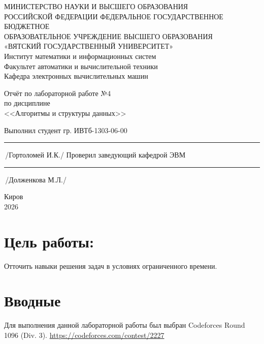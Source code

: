 \documentclass[oneside,a4paper,14pt]{extarticle} %
\begin{document}
	\newpage\thispagestyle{empty}
	\begin{center}
		МИНИСТЕРСТВО НАУКИ И ВЫСШЕГО ОБРАЗОВАНИЯ\\
			РОССИЙСКОЙ ФЕДЕРАЦИИ
			ФЕДЕРАЛЬНОЕ ГОСУДАРСТВЕННОЕ БЮДЖЕТНОЕ\\
			ОБРАЗОВАТЕЛЬНОЕ
			УЧРЕЖДЕНИЕ ВЫСШЕГО ОБРАЗОВАНИЯ\\
			«ВЯТСКИЙ ГОСУДАРСТВЕННЫЙ УНИВЕРСИТЕТ»\\
			Институт математики и информационных систем\\
			Факультет автоматики и вычислительной техники\\
			Кафедра электронных вычислительных машин
	\end{center}
	\vspace{20mm}

	\begin{center}
		Отчёт по лабораторной работе №4\\
		по дисциплине\\
		<<Алгоритмы и структуры данных>>\\
	\end{center}
	\vspace{48mm}

	\noindent
	Выполнил студент гр. ИВТб-1303-06-00 \hfill \rule[-0,5mm]{30mm}{0.15mm}\,/Гортоломей И.К./
	\newline
	Проверил заведующий кафедрой ЭВМ \hfill \rule[-0,5mm]{30mm}{0.15mm}\,/Долженкова М.Л./

	\vfill
	\begin{center}
		Киров\\
		2026
	\end{center}

	\newpage

	\section*{Цель работы:}
	Отточить навыки решения задач в условиях ограниченного времени.

  \section*{Вводные}
  Для выполнения данной лабораторной работы был выбран Codeforces Round 1096 (Div. 3). 
  \url{https://codeforces.com/contest/2227}
\end{document}

